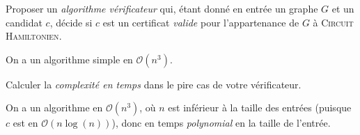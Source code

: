 \begin{exercice}[\textsc{Circuit Hamiltonien} est NP-complet%
    \footnote{Vidéo détaillée de la réduction de \textsc{3-SAT} à \textsc{Cycle Hamiltonien} : \url{https://www.youtube.com/watch?v=OHnX-R_SBpM}}]
  \ifcorrection{\newpage}
  \begin{questions}
  \item Proposer un \emph{algorithme vérificateur} qui, étant donné en entrée un graphe $G$ et un candidat $c$,
    décide si $c$ est un certificat \emph{valide} pour l'appartenance de $G$ à \textsc{Circuit Hamiltonien}.
  \end{questions}
  \begin{corrections}
    On a un algorithme simple en $\mathcal{O}(n^3)$. \\
    \begin{algorithm}[H]
    \end{algorithm}
  \end{corrections}

  \begin{questions}
  \item Calculer la \emph{complexité en temps} dans le pire cas de votre vérificateur.
  \end{questions}
  \begin{corrections}
    On a un algorithme en $\mathcal{O}(n^3)$, où $n$ est inférieur à la taille des entrées (puisque $c$ est en $\mathcal{O}(n \log(n))$),
    donc en temps \emph{polynomial} en la taille de l'entrée.
  \end{corrections}


\end{exercice}

